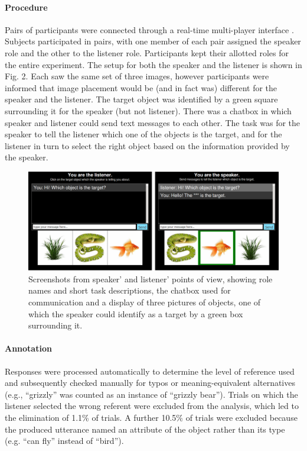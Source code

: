 \documentclass[10pt,letterpaper]{article}
\newcommand{\ndg}[1]{\textcolor{Green}{[ndg: #1]}}
\begin{document}
\paragraph{\bf Procedure}
Pairs of participants were connected through a real-time multi-player interface \cite{Hawkins15_RealTimeWebExperiments}. Subjects participated in pairs, with one member of each pair assigned the speaker role and the other to the listener role. Participants kept their allotted roles for the entire experiment. 
The setup for both the speaker and the listener is shown in Fig. 2. Each saw the same set of three images, however participants were informed that image placement would be (and in fact was) different for the speaker and the listener. The target object was identified by a green square surrounding it for the speaker (but not listener). There was a chatbox in which speaker and listener could send text messages to each other. The task was for the speaker to tell the listener which one of the objects is the target, and for the listener in turn to select the right object based on the information provided by the speaker. 

\begin{figure}[ht!]
\centering
\includegraphics[width=.5\textwidth]{graphs/procedure}
\caption{Screenshots from speaker' and listener' points of view, showing role names and short task descriptions, the chatbox used for communication and a display of three pictures of objects, one of which the speaker could identify as a target by a green box surrounding it.}
\label{fig:procedure}
\end{figure}

\paragraph{\bf Annotation}
Responses were processed automatically to determine the level of reference used and subsequently checked manually for typos or meaning-equivalent alternatives (e.g., ``grizzly'' was counted as an instance of ``grizzly bear''). 
Trials on which the listener selected the wrong referent were excluded from the analysis, which led to the elimination of 1.1\% of trials. A further 10.5\% of trials were excluded because the produced utterance named an attribute of the object rather than its type (e.g. ``can fly'' instead of ``bird'').
\end{document}
